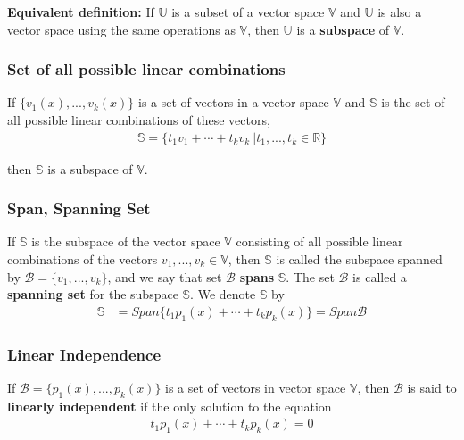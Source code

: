 \documentclass[a4paper,9pt]{extarticle}
\begin{document}
\begin{multicols*}{2}
\textbf{Equivalent definition:} If $\mathbb{U}$ is a subset of a vector space $\mathbb{V}$ and $\mathbb{U}$ is also a vector space using the same operations as $\mathbb{V}$, then $\mathbb{U}$ is a \textbf{subspace} of $\mathbb{V}$.


\subsubsection{Set of all possible linear combinations}
If $\{v_1(x), ..., v_k(x)\}$ is a set of vectors in a vector space $\mathbb{V}$ and $\mathbb{S}$ is the set of all possible linear combinations of these vectors,
\begin{equation} \label{4.2-1}
    \begin{split}
        \mathbb{S} = \{t_1 v_1 + \cdots + t_k v_k \> | t_1, ..., t_k \in \mathbb{R}\}
    \end{split}
\end{equation}

then $\mathbb{S}$ is a subspace of $\mathbb{V}$.


\subsubsection{Span, Spanning Set}
If $\mathbb{S}$ is the subspace of the vector space $\mathbb{V}$ consisting of all possible linear combinations of the vectors $v_1, ..., v_k \in \mathbb{V}$, then $\mathbb{S}$ is called the subspace spanned by $\mathcal{B} = \{v_1, ..., v_k\}$, and we say that set $\mathcal{B}$ \textbf{spans} $\mathbb{S}$. The set $\mathcal{B}$ is called a \textbf{spanning set} for the subspace $\mathbb{S}$. We denote $\mathbb{S}$ by
\begin{equation} \label{4.2-2}
    \begin{split}
        \mathbb{S} & = Span \{t_1 p_1(x) + \cdots + t_k p_k(x)\} = Span \mathcal{B}
    \end{split}
\end{equation}


\subsubsection{Linear Independence}
If $\mathcal{B} = \{p_1(x), ..., p_k(x)\}$ is a set of vectors in vector space $\mathbb{V}$, then $\mathcal{B}$ is said to \textbf{linearly independent} if the only solution to the equation 
\begin{equation} \label{4.2-3}
    \begin{split}
        t_1 p_1(x) + \cdots + t_k p_k(x) = 0
    \end{split}
\end{equation}


\end{multicols*}
\end{document}
